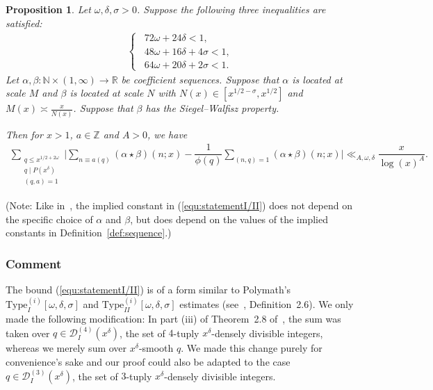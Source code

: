 \documentclass{amsart}
\newtheorem{prop}{Proposition}
\numberwithin{equation}{section}
\begin{document}
\begin{prop} \label{prop:typeI/IIestimate}
Let $\omega, \delta, \sigma >0$. Suppose the following three inequalities are satisfied:
\begin{align*}
\begin{cases}
\,\,\, 72\omega + 24 \delta < 1, \\
\,\,\, 48 \omega + 16\delta + 4\sigma <1, \\ 
\,\,\, 64 \omega +20\delta+2\sigma<1.
\end{cases}
\end{align*}
   Let $\alpha, \beta: \mathbb{N}\times (1,\infty) \rightarrow \mathbb{R}$ be   coefficient sequences. Suppose that $\alpha$ is located at  scale $M$ and $\beta$ is located at  scale $N$ with $N(x) \in [x^{1/2-\sigma},x^{1/2}]$ and $M(x) \asymp \frac{x}{N(x)}$. Suppose  that $\beta$ has  the Siegel--Walfisz property.
   
   \vspace{3mm}
Then  for $x>1$, $a \in \mathbb{Z}$ and $A>0$, we have
\begin{align} \label{equ:statementI/II}
\sum_{\substack{q \leq x^{1/2+2\omega } \\ q \mid P(x^\delta) \\ (q,a)=1}} \Bigg| \sum_{n \equiv a (q)} (\alpha \star \beta)(n;x) - \dfrac{1}{\phi(q)} \sum_{(n,q)=1}(\alpha \star \beta)(n;x) \Bigg| \ll_{A, \omega, \delta}  \dfrac{x}{\log(x)^A}.
\end{align} 
\end{prop}
(Note: Like in~\cite{Polymath:2014:EDZ}, the implied constant in (\ref{equ:statementI/II}) does not depend on the specific choice of $\alpha$ and $\beta$, but does depend on the values of the implied constants in Definition~\ref{def:sequence}.)

\subsubsection{Comment}
The bound (\ref{equ:statementI/II}) is of a  form similar to  Polymath's $\mbox{Type}_I^{(i)}[\omega,\delta,\sigma]$ and $\mbox{Type}_{II}^{(i)}[\omega,\delta,\sigma]$ estimates (see~\cite{Polymath:2014:EDZ}, Definition~2.6). We only made the following modification: In part (iii) of Theorem~2.8 of~\cite{Polymath:2014:EDZ}, the sum was taken over $q \in \mathcal{D}_I^{(4)}(x^\delta)$, the set of $4$-tuply $x^\delta$-densely divisible integers, whereas we merely sum over $x^\delta$-smooth $q$. We made this change purely for convenience's sake and our proof could also be adapted to the case $q \in \mathcal{D}_I^{(3)}(x^\delta)$, the set of $3$-tuply $x^\delta$-densely divisible integers.
\end{document}
